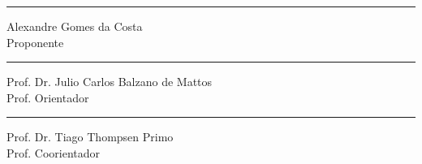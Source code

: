 \documentclass[diss-proposta,nocipinfo]{texufpel}
\begin{document}
\begin{center}
\rule{8cm}{.3mm}
\medskip

	Alexandre Gomes da Costa\\
	Proponente

\end{center}

\vspace{4cm}

\begin{center}
\rule{8cm}{.3mm}
\medskip

	Prof. Dr. Julio Carlos Balzano de Mattos\\
	Prof. Orientador

\end{center}

\vspace{4cm}

\begin{center}
\rule{8cm}{.3mm}
\medskip

	Prof. Dr. Tiago Thompsen Primo\\
	Prof. Coorientador

\end{center}
\end{document}
